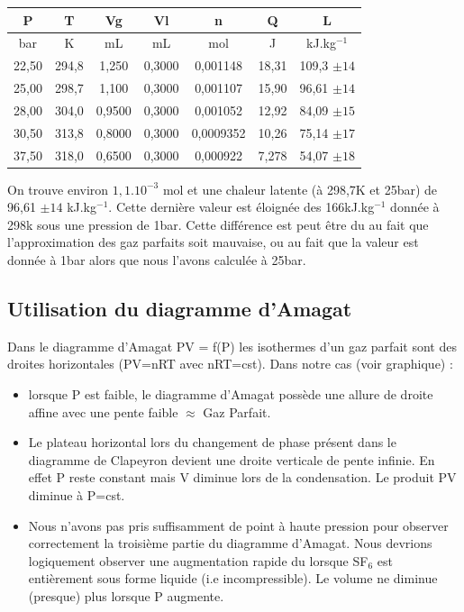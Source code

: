 \documentclass[12pt,a4paper]{article}
\begin{document}
\begin{enumerate}
\begin{center}
\begin{tabular}{|c|c|c|c|c|c|c|}
P & T & Vg & Vl & n & Q & L  \\ \hline
bar & K & mL & mL & mol & J & kJ.kg$^{-1}$  \\ \hline
22,50 & 294,8 & 1,250 &  0,3000 & 0,001148 & 18,31 & 109,3 $\pm  14$  \\ \hline
25,00 & 298,7 & 1,100 &  0,3000 & 0,001107 & 15,90 & 96,61 $\pm 14$  \\ \hline
28,00 & 304,0 & 0,9500 &  0,3000 & 0,001052 & 12,92 & 84,09 $\pm 15$  \\ \hline
30,50 & 313,8 & 0,8000 &  0,3000 & 0,0009352 & 10,26 & 75,14 $\pm 17$  \\ \hline
37,50 & 318,0 & 0,6500 &  0,3000 & 0,000922 & 7,278 & 54,07 $\pm 18$\\  \hline
\end{tabular}
\end{center}
On trouve environ $1,1.10^{-3}$ mol et une chaleur latente (à 298,7K et 25bar) de 96,61 $\pm14$ kJ.kg$^{-1}$. Cette dernière valeur est éloignée des 166kJ.kg$^{-1}$ donnée à 298k sous une pression de 1bar. Cette différence est peut être du au fait que l'approximation des gaz parfaits soit mauvaise, ou au fait que la valeur est donnée à 1bar alors que nous l'avons calculée à 25bar.
\end{enumerate}

\subsection{Utilisation du diagramme d'Amagat}
Dans le diagramme d’Amagat PV = f(P) les isothermes d'un gaz parfait sont des droites horizontales (PV=nRT avec nRT=cst).
Dans notre cas (voir graphique) :
\begin{itemize}
\item lorsque P est faible, le diagramme d’Amagat possède une allure de droite affine avec une pente faible  $\approx$ Gaz Parfait.
\item Le plateau horizontal lors du changement de phase présent dans le diagramme de Clapeyron devient une droite verticale de pente infinie. En effet P reste constant mais V diminue lors de la condensation. Le produit PV diminue à P=cst.
\item Nous n'avons pas pris suffisamment de point à haute pression pour observer correctement la troisième partie du diagramme d'Amagat. Nous devrions logiquement observer une augmentation rapide du  lorsque SF$_{6}$ est entièrement sous forme liquide (i.e incompressible). Le volume ne diminue (presque) plus lorsque P augmente.
\end{itemize}    
\end{document}
